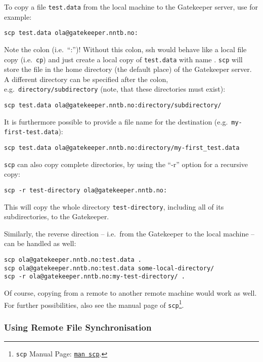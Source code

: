 To copy a file \texttt{test.data} from the local machine to the Gatekeeper server, use for example:
\begin{lstlisting}
scp test.data ola@gatekeeper.nntb.no:
\end{lstlisting}
Note the colon (i.e.\ ``:'')! Without this colon, ssh would behave like a local file copy (i.e.\ \texttt{cp}) and just create a local copy of \texttt{test.data} with name . \texttt{scp} will store the file in the home directory (the default place) of the Gatekeeper server. A different directory can be specified after the colon, e.g.\ \texttt{directory/subdirectory} (note, that these directories must exist):
\begin{lstlisting}
scp test.data ola@gatekeeper.nntb.no:directory/subdirectory/
\end{lstlisting}
It is furthermore possible to provide a file name for the destination (e.g.\ \texttt{my-first-test.data}):
\begin{lstlisting}
scp test.data ola@gatekeeper.nntb.no:directory/my-first_test.data
\end{lstlisting}
\texttt{scp} can also copy complete directories, by using the ``-r'' option for a recursive copy:
\begin{lstlisting}
scp -r test-directory ola@gatekeeper.nntb.no:
\end{lstlisting}
This will copy the whole directory \texttt{test-directory}, including all of its subdirectories, to the Gatekeeper.

Similarly, the reverse direction -- i.e.\ from the Gatekeeper to the local machine -- can be handled as well:
\begin{lstlisting}
scp ola@gatekeeper.nntb.no:test.data .
scp ola@gatekeeper.nntb.no:test.data some-local-directory/
scp -r ola@gatekeeper.nntb.no:my-test-directory/ .
\end{lstlisting}
Of course, copying from a remote to another remote machine would work as well.
For further possibilities, also see the manual page of \texttt{scp}\footnote{\texttt{scp} Manual Page: \texttt{\href{man:scp}{man scp}}.}.


\subsubsection{Using Remote File Synchronisation}

